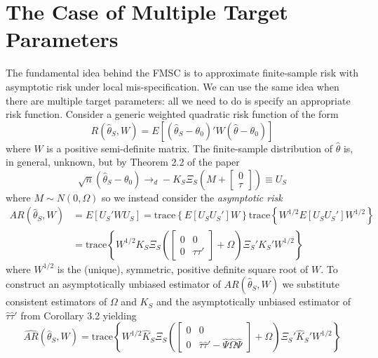 \section{The Case of Multiple Target Parameters}
\label{append:mult}
  The fundamental idea behind the FMSC is to approximate finite-sample risk with asymptotic risk under local mis-specification.
  We can use the same idea when there are multiple target parameters: all we need to do is specify an appropriate risk function.
  Consider a generic weighted quadratic risk function of the form
  \[
    R(\widehat{\theta}_S,W) = E\left[ \left( \widehat{\theta}_S - \theta_0 \right)' W \left( \widehat{\theta} - \theta_0 \right)\right]
  \]
  where $W$ is a positive semi-definite matrix.
  The finite-sample distribution of $\widehat{\theta}$ is, in general, unknown, but by Theorem 2.2 of the paper
  \[
    \sqrt{n} \left( \widehat{\theta}_S - \theta_0\right) \rightarrow_d -K_S \Xi_S \left( M + \left[
    \begin{array}{c}
      0 \\ \tau
    \end{array}
  \right]\right) \equiv U_S
  \]
  where $M\sim N(0,\Omega)$ so we instead consider the \emph{asymptotic risk}
  \begin{align*}
    AR(\widehat{\theta}_S, W) &= E\left[ U_S' W U_S \right] = \mbox{trace}\left\{ E\left[ U_S U_S' \right]W \right\} \mbox{trace}\left\{W^{1/2} E\left[ U_S U_S' \right]W^{1/2} \right\}\\
    &= \mbox{trace}\left\{ W^{1/2}K_S \Xi_S 
      \left( \left[
      \begin{array}{cc}
        0 & 0 \\
        0 & \tau \tau'
      \end{array}
    \right] + \Omega\right)
    \Xi_S' K_S'W^{1/2} \right\}
  \end{align*}
  where $W^{1/2}$ is the (unique), symmetric, positive definite square root of $W$.
  To construct an asymptotically unbiased estimator of $AR(\widehat{\theta}_S, W)$ we substitute consistent estimators of $\Omega$ and $K_S$ and the asymptotically unbiased estimator of $\widehat{\tau}\widehat{\tau}'$ from Corollary 3.2 yielding
  \[
    \widehat{AR}\left( \widehat{\theta}_S, W \right) = 
    \mbox{trace}\left\{ W^{1/2}\widehat{K}_S \Xi_S 
      \left( \left[
      \begin{array}{cc}
        0 & 0 \\
        0 & \widehat{\tau}\widehat{\tau}' - \widehat{\Psi}\widehat{\Omega}\widehat{\Psi}
      \end{array}
    \right] + \Omega\right)
    \Xi_S' \widehat{K}_S'W^{1/2} \right\}
  \]
